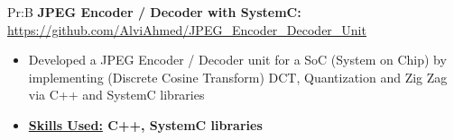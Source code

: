 
Pr:B
\textbf{JPEG Encoder / Decoder with SystemC: }
\underline{\url{https://github.com/AlviAhmed/JPEG_Encoder_Decoder_Unit}}
\begin{itemize}[noitemsep,nolistsep]
\item Developed a JPEG Encoder / Decoder unit for a SoC (System on Chip) by implementing
  (Discrete Cosine Transform) DCT, Quantization and Zig Zag via C++ and SystemC libraries
\item \textbf{\underline{Skills Used:} C++, SystemC libraries}
\end{itemize}

